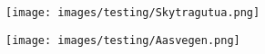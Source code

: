 
\begin{figure}[H]
    \centering
    \texttt{[image: images/testing/Skytragutua.png]}
\end{figure}
            
\begin{figure}[H]
    \centering
    \texttt{[image: images/testing/Aasvegen.png]}
\end{figure}
            